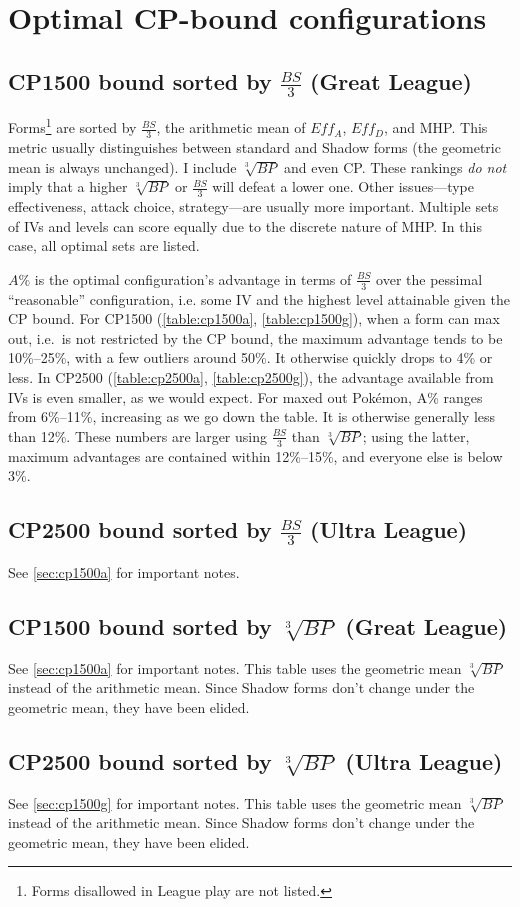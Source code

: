 \chapter{Optimal CP-bound configurations\label{chap:optimal}}
\section{CP1500 bound sorted by $\frac{BS}{3}$ (Great League)\label{sec:cp1500a}}
Forms\footnote{Forms disallowed in League play are not listed.} are sorted by $\frac{BS}{3}$,
  the arithmetic mean of $Eff_A$, $Eff_D$, and MHP\@.
This metric usually distinguishes between standard and Shadow forms (the geometric mean is always unchanged).
I include $\sqrt[3]{BP}$ and even CP\@.
These rankings \textit{do not} imply that a higher $\sqrt[3]{BP}$ or $\frac{BS}{3}$
  will defeat a lower one.
Other issues---type effectiveness, attack choice, strategy---are usually more important.
Multiple sets of IVs and levels can score equally due to the discrete nature of MHP\@.
In this case, all optimal sets are listed.

$A\%$ is the optimal configuration's advantage in terms of $\frac{BS}{3}$
  over the pessimal ``reasonable'' configuration, i.e. some IV
  and the highest level attainable given the CP bound.
For CP1500 (\autoref{table:cp1500a}, \autoref{table:cp1500g}), when a form can max out, i.e.\ is not restricted by the CP bound,
  the maximum advantage tends to be 10\%--25\%, with a few outliers around 50\%.
It otherwise quickly drops to 4\% or less.
In CP2500 (\autoref{table:cp2500a}, \autoref{table:cp2500g}), the advantage available from IVs is even smaller, as we would expect.
For maxed out Pokémon, A\% ranges from 6\%--11\%, increasing as we go down the table.
It is otherwise generally less than 12\%.
These numbers are larger using $\frac{BS}{3}$ than $\sqrt[3]{BP}$; using the latter,
  maximum advantages are contained within 12\%--15\%, and everyone else is below 3\%.

\section{CP2500 bound sorted by $\frac{BS}{3}$ (Ultra League)}
See \autoref{sec:cp1500a} for important notes.

\section{CP1500 bound sorted by $\sqrt[3]{BP}$ (Great League)\label{sec:cp1500g}}
See \autoref{sec:cp1500a} for important notes.
This table uses the geometric mean $\sqrt[3]{BP}$ instead of the arithmetic mean.
Since Shadow forms don't change under the geometric mean, they have been elided.

\section{CP2500 bound sorted by $\sqrt[3]{BP}$ (Ultra League)\label{sec:cp2500g}}
See \autoref{sec:cp1500g} for important notes.
This table uses the geometric mean $\sqrt[3]{BP}$ instead of the arithmetic mean.
Since Shadow forms don't change under the geometric mean, they have been elided.

